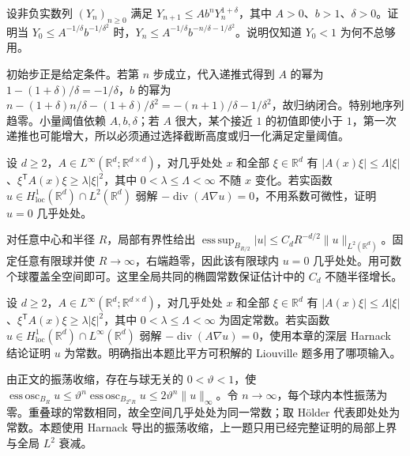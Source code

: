 \begin{exercise}\label{b2:ex:16-iteration-lemma}
设非负实数列 \((Y_n)_{n\ge0}\) 满足 \(Y_{n+1}\le Ab^nY_n^{1+\delta}\)，其中 \(A>0\)、\(b>1\)、\(\delta>0\)。证明当 \(Y_0\le A^{-1/\delta}b^{-1/\delta^2}\) 时，\(Y_n\le A^{-1/\delta}b^{-n/\delta-1/\delta^2}\)。说明仅知道 \(Y_0<1\) 为何不总够用。
\end{exercise}
\begin{solution}
初始步正是给定条件。若第 \(n\) 步成立，代入递推式得到 \(A\) 的幂为 \(1-(1+\delta)/\delta=-1/\delta\)，\(b\) 的幂为 \(n-(1+\delta)n/\delta-(1+\delta)/\delta^2=-(n+1)/\delta-1/\delta^2\)，故归纳闭合。特别地序列趋零。小量阈值依赖 \(A,b,\delta\)；若 \(A\) 很大，某个接近 \(1\) 的初值即使小于 \(1\)，第一次递推也可能增大，所以必须通过选择截断高度或归一化满足定量阈值。
\end{solution}

\begin{exercise}\label{b2:ex:16-l2-liouville}
设 \(d\ge2\)，\(A\in L^\infty(\mathbb R^d;\mathbb R^{d\times d})\)，对几乎处处 \(x\) 和全部 \(\xi\in\mathbb R^d\) 有 \(|A(x)\xi|\le\Lambda|\xi|\)、\(\xi^{\mathsf T}A(x)\xi\ge\lambda|\xi|^2\)，其中 \(0<\lambda\le\Lambda<\infty\) 不随 \(x\) 变化。若实函数 \(u\in H_{\mathrm{loc}}^1(\mathbb R^d)\cap L^2(\mathbb R^d)\) 弱解 \(-\operatorname{div}(A\nabla u)=0\)，不用系数可微性，证明 \(u=0\) 几乎处处。
\end{exercise}
\begin{solution}
对任意中心和半径 \(R\)，局部有界性给出 \(\operatorname*{ess\,sup}_{B_{R/2}}|u|\le C_dR^{-d/2}\lVert u\rVert_{L^2(\mathbb R^d)}\)。固定任意有限球并使 \(R\to\infty\)，右端趋零，因此该有限球内 \(u=0\) 几乎处处。用可数个球覆盖全空间即可。这里全局共同的椭圆常数保证估计中的 \(C_d\) 不随半径增长。
\end{solution}

\begin{optionalexercise}\label{b2:ex:16-bounded-liouville}
设 \(d\ge2\)，\(A\in L^\infty(\mathbb R^d;\mathbb R^{d\times d})\)，对几乎处处 \(x\) 和全部 \(\xi\in\mathbb R^d\) 有 \(|A(x)\xi|\le\Lambda|\xi|\)、\(\xi^{\mathsf T}A(x)\xi\ge\lambda|\xi|^2\)，其中 \(0<\lambda\le\Lambda<\infty\) 为固定常数。若实函数 \(u\in H_{\mathrm{loc}}^1(\mathbb R^d)\cap L^\infty(\mathbb R^d)\) 弱解 \(-\operatorname{div}(A\nabla u)=0\)，使用本章的深层 Harnack 结论证明 \(u\) 为常数。明确指出本题比平方可积解的 Liouville 题多用了哪项输入。
\end{optionalexercise}
\begin{solution}
由正文的振荡收缩，存在与球无关的 \(0<\vartheta<1\)，使 \(\operatorname*{ess\,osc}_{B_R}u\le\vartheta^n\operatorname*{ess\,osc}_{B_{2^nR}}u\le2\vartheta^n\lVert u\rVert_\infty\)。令 \(n\to\infty\)，每个球内本性振荡为零。重叠球的常数相同，故全空间几乎处处为同一常数；取 Hölder 代表即处处为常数。本题使用 Harnack 导出的振荡收缩，上一题只用已经完整证明的局部上界与全局 \(L^2\) 衰减。
\end{solution}

